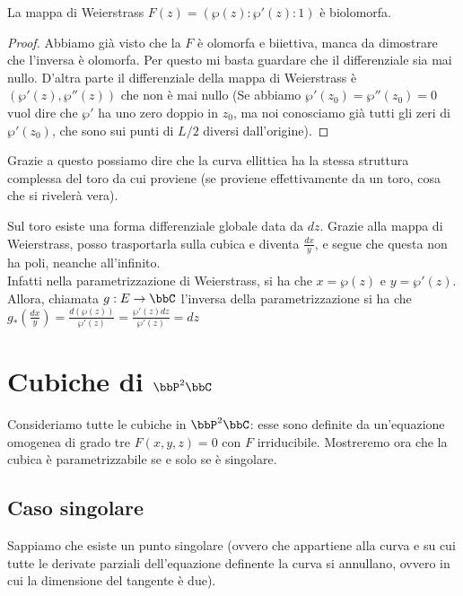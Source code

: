   \begin{proposizione}
      La mappa di Weierstrass $F(z)=(\wp(z) : \wp'(z) : 1)$ è biolomorfa.
  \end{proposizione}
  \begin{proof}
      Abbiamo già visto che la $F$ è olomorfa e biiettiva, manca da dimostrare che l'inversa è olomorfa.
      Per questo mi basta guardare che il differenziale sia mai nullo. D'altra parte il differenziale della mappa di Weierstrass è $ (\wp'(z), \wp''(z))$ che non è mai nullo (Se abbiamo $\wp'(z_0) = \wp''(z_0) = 0$ vuol dire che $\wp'$ ha uno zero doppio in $z_0$, ma noi conosciamo già tutti gli zeri di $\wp'(z_0)$, che sono sui punti di $L/2$ diversi dall'origine).
  \end{proof}

  Grazie a questo possiamo dire che la curva ellittica ha la stessa struttura complessa del toro da cui proviene (se proviene effettivamente da un toro, cosa che si rivelerà vera).

  \begin{osservazione}
      Sul toro esiste una forma differenziale globale data da $dz$. Grazie alla mappa di Weierstrass, posso trasportarla sulla cubica e diventa $\frac{dx}y$, e segue che questa non ha poli, neanche all'infinito.\\
      Infatti nella parametrizzazione di Weierstrass, si ha che $x = \wp(z)$ e $y = \wp'(z)$. Allora, chiamata $g: E \rar \bbC$ l'inversa della parametrizzazione si ha che $g_*(\frac{dx}{y}) = \frac{d(\wp(z))}{\wp'(z)} = \frac{\wp'(z) dz}{\wp'(z)} = dz$

  \end{osservazione}

\section{Cubiche di $\bbP^2\bbC$}
Consideriamo tutte le cubiche in $\bbP^2\bbC$: esse sono definite da
un'equazione omogenea di grado tre $F(x, y, z) = 0$ con $F$
irriducibile. Mostreremo ora che la cubica è parametrizzabile se e solo
se è singolare.


\subsection{Caso singolare}
Sappiamo che esiste un punto singolare (ovvero che appartiene alla curva
e su cui tutte le derivate parziali dell'equazione definente la curva si
annullano, ovvero in cui la dimensione del tangente è due).

